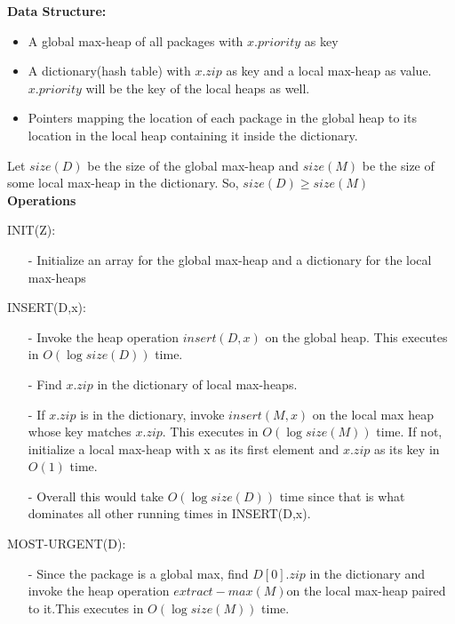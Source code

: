 \documentclass[12pt,twoside]{article}
\begin{document}
\begin{problems}
\textbf{Data Structure:} 
\begin{itemize}
	\item A global  max-heap  of all packages with $ x.priority $ as key
	\item A dictionary(hash table) with $ x.zip$ as key and a local max-heap as value. $ x.priority $ will be the key of the local heaps as well.
	\item Pointers mapping the location of each package in the global heap to its location in the local heap containing it inside the dictionary.
\end{itemize}

Let $ size(D) $ be the size of the global max-heap and $ size(M) $ be the size of some local max-heap in the dictionary. So, $ size(D)  \geq size(M) $ \\

\textbf{Operations}

INIT(Z):

\begin{itemize}
	\item[- ] Initialize an array for the global max-heap and a dictionary for the local max-heaps
\end{itemize}

INSERT(D,x): 
\begin{itemize}
	\item[- ] Invoke the heap operation $ insert(D,x) $ on the global heap. This executes in $O(\log size(D))$ time.
	
	\item[- ] Find $ x.zip  $ in the dictionary of local max-heaps. 
	
	\item[- ] If $ x.zip$ is in the dictionary, invoke $ insert(M,x) $ on the local max heap whose key matches $ x.zip $. This executes in $ O(\log size(M)) $ time. If not, initialize a local max-heap with x as its first element and $ x.zip $ as its key in $ O(1) $ time. 
	
	\item[- ] Overall this would take $O(\log size(D))$ time since that is what dominates all other running times in INSERT(D,x).
\end{itemize}

MOST-URGENT(D): 


\begin{itemize}
	\item[- ] Since the package is a global max, find $ D[0].zip $ in the dictionary and invoke the heap operation $ extract-max(M)  $on the local max-heap paired to it.This executes in $O(\log size(M)) $ time.
	

\end{itemize}
\end{problems}
\end{document}
